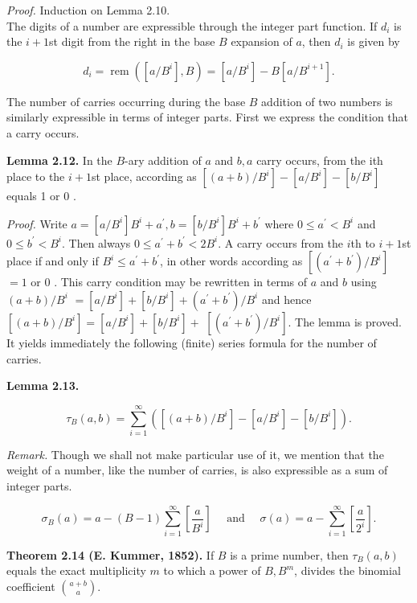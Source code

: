 \documentclass[11pt,a4paper]{article}
\newcommand{\origpage}[1]{\marginnote{\footnotesize\textbf{[#1]}}}
\begin{document}
\noindent\emph{Proof.} Induction on Lemma 2.10.\\
The digits of a number are expressible through the integer part function. If $d_{i}$ is the $i+1$st digit from the right in the base $B$ expansion of $a$, then $d_{i}$ is given by

\[
d_{i}=\operatorname{rem}\left(\left[a / B^{i}\right], B\right)=\left[a / B^{i}\right]-B\left[a / B^{i+1}\right] .
\]

The number of carries occurring during the base $B$ addition of two numbers is similarly expressible in terms of integer parts. First we express the condition that a carry occurs.

\noindent\textbf{Lemma 2.12.} In the $B$-ary addition of $a$ and $b,\allowbreak  a$ carry occurs, from the ith place to the $i+1$st place, according as $\left[(a+b) / B^{i}\right]-\left[a / B^{i}\right]-\left[b / B^{i}\right]$ equals 1 or 0 .

\noindent\emph{Proof.} Write $a=\left[a / B^{i}\right] B^{i}+a^{\prime},\allowbreak  b=\left[b / B^{i}\right] B^{i}+b^{\prime}$ where $0 \leq a^{\prime}<B^{i}$ and $0 \leq b^{\prime}<B^{i}$. Then always $0 \leq a^{\prime}+b^{\prime}<2 B^{i}$. A carry occurs from the $i$th to $i+1$st place if and only if $B^{i} \leq a^{\prime}+b^{\prime}$, in other words according as $\left[\left(a^{\prime}+b^{\prime}\right) / B^{i}\right]$ $=1$ or 0 . This carry condition may be rewritten in terms of $a$ and $b$ using $(a+b) / B^{i}$ $=\left[a / B^{i}\right]+\left[b / B^{i}\right]+\left(a^{\prime}+b^{\prime}\right) / B^{i}$ and hence $\left[(a+b) / B^{i}\right]=\left[a / B^{i}\right]+\left[b / B^{i}\right]+$ $\left[\left(a^{\prime}+b^{\prime}\right) / B^{i}\right]$. The lemma is proved. It yields immediately the following (finite) series formula for the number of carries.

\noindent\textbf{Lemma 2.13.}

\[
\tau_{B}(a,b)=\sum_{i=1}^{\infty}\left(\left[(a+b)/B^{i}\right]-\left[a/B^{i}\right]-\left[b/B^{i}\right]\right).
\]

\noindent\emph{Remark.} \origpage{555}Though we shall not make particular use of it, we mention that the weight of a number, like the number of carries, is also expressible as a sum of integer parts.

\[
\sigma_{B}(a)=a-(B-1) \sum_{i=1}^{\infty}\left[\frac{a}{B^{i}}\right] \quad \text { and } \quad \sigma(a)=a-\sum_{i=1}^{\infty}\left[\frac{a}{2^{i}}\right] .
\]

\noindent\textbf{Theorem 2.14 (E. Kummer, 1852).} If $B$ is a prime number, then $\tau_{B}(a,\allowbreak  b)$ equals the exact multiplicity $m$ to which a power of $B,\allowbreak  B^{m}$, divides the binomial coefficient $\binom{a+b}{a}$.
\end{document}
